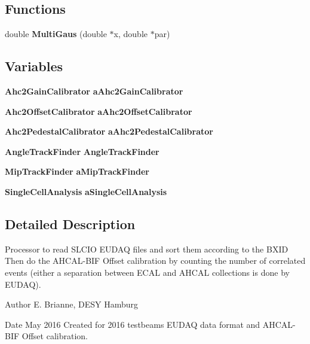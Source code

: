 \subsection*{Functions}
\begin{DoxyCompactItemize}
\item 
double {\bfseries MultiGaus} (double $\ast$x, double $\ast$par)\label{namespaceCALICE_ab027e03d90dee39729ce0c0ff8524bfb}

\end{DoxyCompactItemize}
\subsection*{Variables}
\begin{DoxyCompactItemize}
\item 
{\bf Ahc2GainCalibrator} {\bfseries aAhc2GainCalibrator}\label{namespaceCALICE_aff0f779ea231c17c5f3447d5f1c85c5a}

\item 
{\bf Ahc2OffsetCalibrator} {\bfseries aAhc2OffsetCalibrator}\label{namespaceCALICE_a0dfd57d58d988a974ce3c87364e65fc1}

\item 
{\bf Ahc2PedestalCalibrator} {\bfseries aAhc2PedestalCalibrator}\label{namespaceCALICE_abe03f653dfffe06ae6550343edbbb184}

\item 
{\bf AngleTrackFinder} {\bfseries AngleTrackFinder}\label{namespaceCALICE_a3a6925ca17e1f05cc97e625f7edd5ed5}

\item 
{\bf MipTrackFinder} {\bfseries aMipTrackFinder}\label{namespaceCALICE_a63db13b96d3be485b4c57ba60db44bdd}

\item 
{\bf SingleCellAnalysis} {\bfseries aSingleCellAnalysis}\label{namespaceCALICE_a0c491b351d33b91639df2101f7725139}

\end{DoxyCompactItemize}


\subsection{Detailed Description}
Processor to read SLCIO EUDAQ files and sort them according to the BXID Then do the AHCAL-\/BIF Offset calibration by counting the number of correlated events (either a separation between ECAL and AHCAL collections is done by EUDAQ). \begin{DoxyAuthor}{Author}
E. Brianne, DESY Hamburg 
\end{DoxyAuthor}
\begin{DoxyDate}{Date}
May 2016 Created for 2016 testbeams EUDAQ data format and AHCAL-\/BIF Offset calibration. 
\end{DoxyDate}
